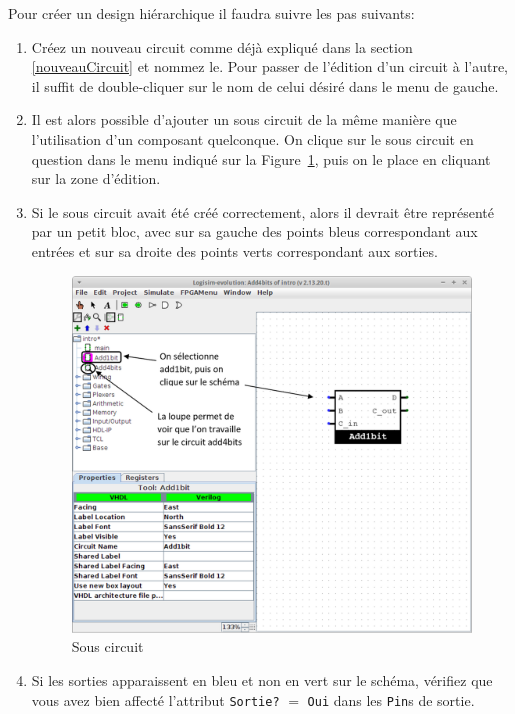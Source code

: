 Pour créer un design hiérarchique il faudra suivre les pas
suivants:
\begin{enumerate}
\item Créez un nouveau circuit comme déjà expliqué dans la section \ref{nouveauCircuit} et nommez le.
Pour passer de l'édition d'un circuit à l'autre, il suffit de double-cliquer sur le nom de celui désiré dans le menu de
gauche.
\item Il est alors possible d'ajouter un sous circuit de la même manière que l'utilisation d'un
composant quelconque. On clique sur le sous circuit en question dans le menu indiqué sur la Figure~\ref{fig_sousCircuit}, puis on le
place en cliquant sur la zone d'édition.
\item Si le sous circuit avait été créé correctement, alors il devrait être représenté par un petit bloc, avec
sur sa gauche des points bleus correspondant aux entrées et sur sa droite des points verts correspondant aux sorties.

\begin{figure}[H]
\begin{center}
\includegraphics[width=450pt]{pictures/logisim_sousCircuit.png}
\caption{\label{fig_sousCircuit}Sous circuit}
\end{center}
\end{figure}

\item Si les sorties apparaissent en bleu et non en vert sur le schéma, vérifiez que vous avez bien affecté l'attribut
\texttt{Sortie?} $=$ \texttt{Oui} dans les \texttt{Pin}s de sortie.

\end{enumerate}

